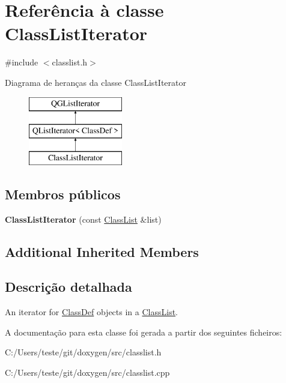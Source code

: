 \hypertarget{class_class_list_iterator}{\section{Referência à classe Class\-List\-Iterator}
\label{class_class_list_iterator}
}


{\ttfamily \#include $<$classlist.\-h$>$}

Diagrama de heranças da classe Class\-List\-Iterator\begin{figure}[H]
\begin{center}
\leavevmode
\includegraphics[height=3.000000cm]{class_class_list_iterator}
\end{center}
\end{figure}
\subsection*{Membros públicos}
\begin{DoxyCompactItemize}
\item 
\hypertarget{class_class_list_iterator_ad3e300639f5f8d3e8f66bbfc4dea90b1}{{\bfseries Class\-List\-Iterator} (const \hyperlink{class_class_list}{Class\-List} \&list)}\label{class_class_list_iterator_ad3e300639f5f8d3e8f66bbfc4dea90b1}

\end{DoxyCompactItemize}
\subsection*{Additional Inherited Members}


\subsection{Descrição detalhada}
An iterator for \hyperlink{class_class_def}{Class\-Def} objects in a \hyperlink{class_class_list}{Class\-List}. 

A documentação para esta classe foi gerada a partir dos seguintes ficheiros\-:\begin{DoxyCompactItemize}
\item 
C\-:/\-Users/teste/git/doxygen/src/classlist.\-h\item 
C\-:/\-Users/teste/git/doxygen/src/classlist.\-cpp\end{DoxyCompactItemize}
